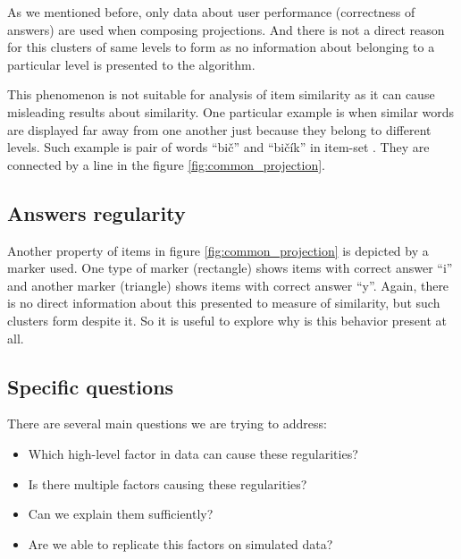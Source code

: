 \documentclass[
  digital, %
  table,   %
  nolof,     %
  nolot,     %
  nocover,
  color,
  final, %
]{fithesis3}
\begin{document}
As we mentioned before, only data about user performance (correctness of answers) are used when composing projections. And there is not a direct reason for this clusters of same levels to form as no information about belonging to a particular level is presented to the algorithm.


This phenomenon is not suitable for analysis of item similarity as it can cause misleading results about similarity. One particular example is when similar words are displayed far away from one another just because they belong to different levels. Such example is pair of words ``bič'' and ``bičík'' in item-set \cviceniB{}. They are connected by a line in the figure \ref{fig:common_projection}.


\subsection{Answers regularity}\label{answers-regularity}

Another property of items in figure \ref{fig:common_projection} is depicted by a marker used. One type of marker (rectangle) shows items with correct answer ``i'' and another marker (triangle) shows items with correct answer ``y''. Again, there is no direct information about this presented to measure of similarity, but such clusters form despite it. So it is useful to explore why is this behavior present at all.


\subsection{Specific questions}\label{specific-questions}

There are several main questions we are trying to address:

\begin{itemize}
 \item Which high-level factor in data can cause these regularities?
 \item Is there multiple factors causing these regularities?
 \item Can we explain them sufficiently?
 \item Are we able to replicate this factors on simulated data?
\end{itemize}
\end{document}
